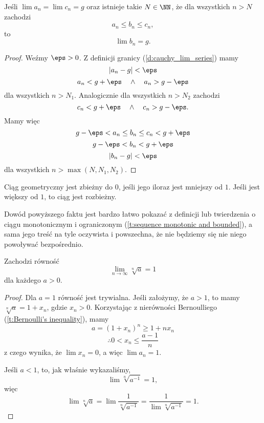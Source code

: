 \begin{theorem}
    \label{t:sequence squeeze theorem}
    Jeśli $\lim a_n = \lim c_n = g$ oraz istnieje takie $N \in \NN$, że dla wszystkich $n > N$ zachodzi
    \[ a_n \leq b_n \leq c_n, \]
    to
    \[ \lim b_n = g. \]
\end{theorem}
\begin{proof}
    Weźmy $\eps > 0$. Z definicji granicy (\ref{d:cauchy_lim_series}) mamy
    \[ |a_n - g| < \eps \]
    \[ a_n < g + \eps \quad\land\quad a_n > g - \eps \]
    dla wszystkich $n > N_1$.
    Analogicznie dla wszystkich $n > N_2$ zachodzi
    \[ c_n < g + \eps \quad\land\quad c_n > g - \eps. \]
    Mamy więc
    \[ g - \eps < a_n \leq b_n \leq c_n < g + \eps \]
    \[ g - \eps < b_n < g + \eps \]
    \[ |b_n - g| < \eps \]
    dla wszystkich $n > \max(N, N_1, N_2)$.
\end{proof}

\begin{fact}
    Ciąg geometryczny jest zbieżny do $0$, jeśli jego iloraz jest mniejszy od $1$. Jeśli jest większy od $1$, to ciąg jest rozbieżny.
\end{fact}
Dowód powyższego faktu jest bardzo łatwo pokazać z definicji lub twierdzenia o ciągu monotonicznym i ograniczonym (\ref{t:sequence monotonic and bounded}), a sama jego treść na tyle oczywista i powszechna, że nie będziemy się nie niego powoływać bezpośrednio.

\begin{theorem}
    \label{t:(a)^(1/n)->1}
    Zachodzi równość
    \[ \lim_{n \to \infty}\sqrt[n]{a} = 1 \]
    dla każdego $a > 0$.
\end{theorem}
\begin{proof}
    Dla $a = 1$ równość jest trywialna. Jeśli założymy, że $a > 1$, to mamy $\sqrt[n]{a} = 1 + x_n$, gdzie $x_n > 0$. Korzystając z nierówności Bernoulliego (\ref{t:Bernoulli's inequality}), mamy
    \[ a = (1 + x_n)^n \geq 1 + nx_n \]
    \[ \therefore 0 < x_n \leq \frac{a - 1}{n} \]
    z czego wynika, że $\lim x_n = 0$, a więc $\lim a_n = 1$.

    Jeśli $a < 1$, to, jak właśnie wykazaliśmy,
    \[ \lim \sqrt[n]{a^{-1}} = 1, \]
    więc
    \[ \lim \sqrt[n]{a} = \lim \frac{1}{\sqrt[n]{a^{-1}}} = \frac{1}{\lim\sqrt[n]{a^{-1}}} = 1. \]
\end{proof}

